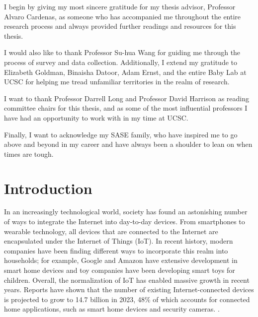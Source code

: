 \documentclass[12pt, draft]{ucthesis}
\begin{document}
\begin{frontmatter}
\begin{acknowledgements}
I begin by giving my most sincere gratitude for my thesis advisor, Professor Alvaro Cardenas, as someone who has accompanied me throughout the entire research process and always provided further readings and resources for this thesis.

I would also like to thank Professor Su-hua Wang for guiding me through the process of survey and data collection. Additionally, I extend my gratitude to Elizabeth Goldman, Binaisha Datoor, Adam Ernst, and the entire Baby Lab at UCSC for helping me tread unfamiliar territories in the realm of research.

I want to thank Professor Darrell Long and Professor David Harrison as reading committee chairs for this thesis, and as some of the most influential professors I have had an opportunity to work with in my time at UCSC.

Finally, I want to acknowledge my SASE family, who have inspired me to go above and beyond in my career and have always been a shoulder to lean on when times are tough.

\end{acknowledgements}

\end{frontmatter}

\chapter{Introduction}
In an increasingly technological world, society has found an astonishing number of ways to integrate the Internet into day-to-day devices. From smartphones to wearable technology, all devices that are connected to the Internet are encapsulated under the Internet of Things (IoT). In recent history, modern companies have been finding different ways to incorporate this realm into households; for example, Google and Amazon have extensive development in smart home devices and toy companies have been developing smart toys for children. Overall, the normalization of IoT has enabled massive growth in recent years. Reports have shown that the number of existing Internet-connected devices is projected to grow to 14.7 billion in 2023, 48\% of which accounts for connected home applications, such as smart home devices and security cameras. \cite{cisco}.
\end{document}
